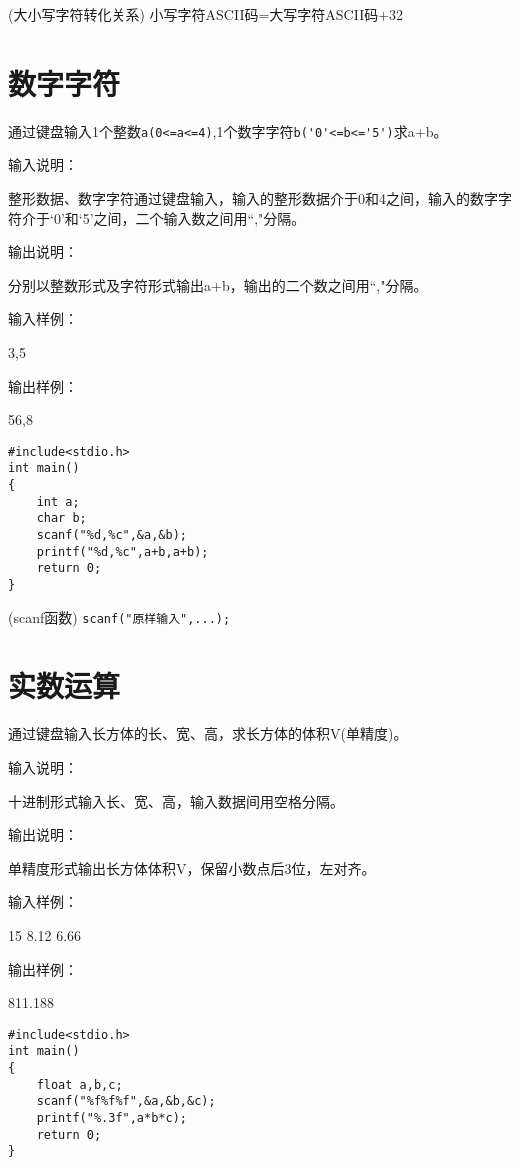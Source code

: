 \begin{note}(大小写字符转化关系)
	小写字符ASCII码=大写字符ASCII码+32
\end{note}

\section{数字字符}
通过键盘输入1个整数\lstinline|a(0<=a<=4)|,1个数字字符\lstinline|b('0'<=b<='5')|求a+b。

输入说明：

整形数据、数字字符通过键盘输入，输入的整形数据介于0和4之间，输入的数字字符介于`0'和`5'之间，二个输入数之间用``,"分隔。

输出说明：

分别以整数形式及字符形式输出a+b，输出的二个数之间用``,"分隔。

输入样例：

3,5

输出样例：

56,8

\begin{lstlisting}
#include<stdio.h>    
int main()                   
{  
	int a;
	char b;
	scanf("%d,%c",&a,&b);
	printf("%d,%c",a+b,a+b); 
	return 0;           
}             
\end{lstlisting}

\begin{note}(scanf函数)
	\lstinline|scanf("原样输入",...);|
\end{note}

\section{实数运算}
通过键盘输入长方体的长、宽、高，求长方体的体积V(单精度)。

输入说明：

十进制形式输入长、宽、高，输入数据间用空格分隔。

输出说明：

单精度形式输出长方体体积V，保留小数点后3位，左对齐。

输入样例：

15  8.12  6.66

输出样例：

811.188


\begin{lstlisting}
#include<stdio.h>   
int main()                   
{  
	float a,b,c;
	scanf("%f%f%f",&a,&b,&c);
	printf("%.3f",a*b*c); 
	return 0;           
}                  
\end{lstlisting}

